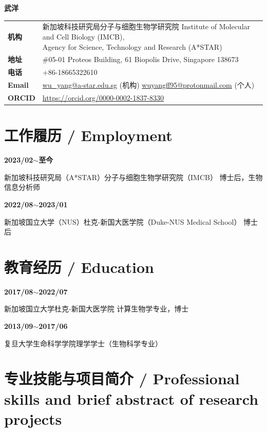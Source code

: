 \documentclass[11pt,a4paper]{article}
\newcommand{\email}[1]{\href{mailto:#1}{#1}}
\newcommand{\urltext}[1]{\href{#1}{#1}}
\begin{document}
\begin{center}
{\Huge\bfseries 武洋}\\[0.5cm]
\end{center}

\begin{center}
\begin{tabular}{lp{10cm}}
\textbf{机构} & \parbox[t]{10cm}{新加坡科技研究局分子与细胞生物学研究院 Institute of Molecular and Cell Biology (IMCB),\\Agency for Science, Technology and Research (A*STAR)} \\
\textbf{地址} & \#05-01 Proteos Building, 61 Biopolis Drive, Singapore 138673 \\
\textbf{电话} & +86-18665322610 \\
\textbf{Email} & \email{wu\_yang@a-star.edu.sg} (机构) \email{wuyangff95@protonmail.com} (个人) \\
\textbf{ORCID} & \urltext{https://orcid.org/0000-0002-1837-8330} \\
\end{tabular}
\end{center}

\vspace{0.5cm}

\section*{工作履历 / Employment}

\textbf{2023/02$\sim$至今}

新加坡科技研究局（A*STAR）分子与细胞生物学研究院（IMCB） 博士后，生物信息分析师

\textbf{2022/08$\sim$2023/01}

新加坡国立大学（NUS）杜克-新国大医学院（Duke-NUS Medical School） 博士后

\section*{教育经历 / Education}

\textbf{2017/08$\sim$2022/07}

新加坡国立大学杜克-新国大医学院 计算生物学专业，博士

\textbf{2013/09$\sim$2017/06}

复旦大学生命科学学院理学学士（生物科学专业）

\section*{专业技能与项目简介 / Professional skills and brief abstract of research projects}
\end{document}
